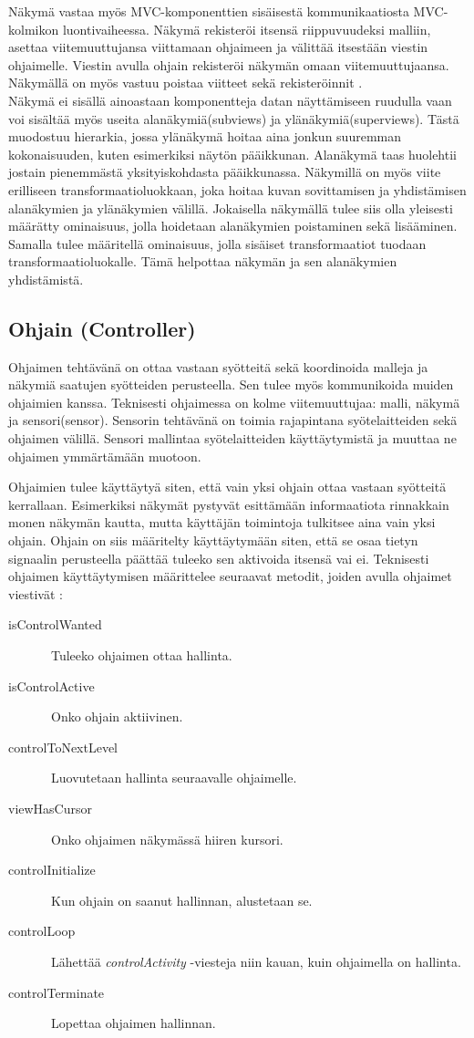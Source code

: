 \documentclass[finnish,utf8,nonumbib,palatino,kandi]{gradu2}
\begin{document}
Näkymä vastaa myös MVC-komponenttien sisäisestä kommunikaatiosta MVC-kolmikon luontivaiheessa. Näkymä rekisteröi itsensä  riippuvuudeksi malliin, asettaa viitemuuttujansa viittamaan ohjaimeen ja välittää itsestään viestin ohjaimelle. Viestin avulla ohjain rekisteröi näkymän omaan viitemuuttujaansa. Näkymällä on myös vastuu poistaa viitteet sekä rekisteröinnit \cite{Burbeck}. \\
Näkymä ei sisällä ainoastaan komponentteja datan näyttämiseen ruudulla vaan voi sisältää myös useita alanäkymiä(subviews) ja ylänäkymiä(superviews). Tästä muodostuu hierarkia, jossa ylänäkymä hoitaa aina jonkun suuremman kokonaisuuden, kuten esimerkiksi näytön pääikkunan. Alanäkymä taas huolehtii jostain pienemmästä yksityiskohdasta pääikkunassa. Näkymillä on myös viite erilliseen transformaatioluokkaan, joka hoitaa kuvan sovittamisen ja yhdistämisen alanäkymien ja ylänäkymien välillä. Jokaisella näkymällä tulee siis olla yleisesti määrätty ominaisuus, jolla hoidetaan alanäkymien poistaminen sekä lisääminen. Samalla tulee määritellä ominaisuus, jolla sisäiset transformaatiot tuodaan transformaatioluokalle. Tämä helpottaa näkymän ja sen alanäkymien yhdistämistä\cite[s. 8]{Krasner:desc}.

\subsection{Ohjain (Controller)}
Ohjaimen tehtävänä on ottaa vastaan syötteitä sekä koordinoida malleja ja näkymiä saatujen syötteiden perusteella. Sen tulee myös kommunikoida muiden ohjaimien kanssa. Teknisesti ohjaimessa on kolme viitemuuttujaa: malli, näkymä ja sensori(sensor). Sensorin tehtävänä on toimia rajapintana syötelaitteiden sekä ohjaimen välillä. Sensori mallintaa syötelaitteiden käyttäytymistä ja muuttaa ne ohjaimen ymmärtämään muotoon.

Ohjaimien tulee käyttäytyä siten, että vain yksi ohjain ottaa vastaan syötteitä kerrallaan. Esimerkiksi näkymät pystyvät esittämään informaatiota rinnakkain monen näkymän kautta, mutta käyttäjän toimintoja tulkitsee aina vain yksi ohjain. Ohjain on siis määritelty käyttäytymään siten, että se osaa tietyn signaalin perusteella päättää tuleeko sen aktivoida itsensä vai ei. Teknisesti ohjaimen käyttäytymisen määrittelee seuraavat metodit, joiden avulla ohjaimet viestivät \cite[s. 9]{Krasner:desc}:
\begin{description}
\item[isControlWanted] \ Tuleeko ohjaimen ottaa hallinta.
\item[isControlActive] \ Onko ohjain aktiivinen.
\item[controlToNextLevel] \ Luovutetaan hallinta seuraavalle ohjaimelle.
\item[viewHasCursor] \ Onko ohjaimen näkymässä hiiren kursori.
\item[controlInitialize] \ Kun ohjain on saanut hallinnan, alustetaan se.
\item[controlLoop] \ Lähettää \emph{controlActivity} -viesteja niin kauan, kuin ohjaimella on hallinta.
\item[controlTerminate] \ Lopettaa ohjaimen hallinnan.
\end{description}
\end{document}
